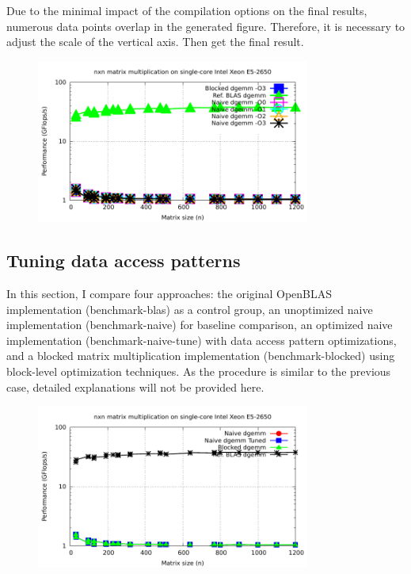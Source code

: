 \documentclass[unicode,11pt,a4paper,oneside,numbers=endperiod,openany]{scrartcl}
\begin{document}
Due to the minimal impact of the compilation options on the final results, numerous data points overlap in the generated figure. Therefore, it is necessary to adjust the scale of the vertical axis. Then get the final result.
\begin{figure}
    \centering
    \includegraphics[width=0.8\textwidth]{pictures/timimg_Compile_options.pdf}
    
\end{figure}

\subsection{Tuning data access patterns}
In this section, I compare four approaches: the original OpenBLAS implementation (benchmark-blas) as a control group, an unoptimized naive implementation (benchmark-naive) for baseline comparison, an optimized naive implementation (benchmark-naive-tune) with data access pattern optimizations, and a blocked matrix multiplication implementation (benchmark-blocked) using block-level optimization techniques. As the procedure is similar to the previous case, detailed explanations will not be provided here.
\begin{figure}[h]
    \centering
    \includegraphics[width=0.8\textwidth]{pictures/timimg_data_access.pdf}
   
\end{figure}
\end{document}
